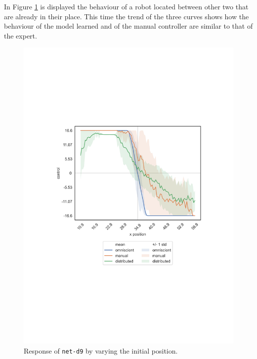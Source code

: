 In Figure \ref{fig:net-d9responseposition} is displayed the behaviour of a robot 
located between other two that are already in their place.
This time the trend of the three curves shows how the behaviour of the model 
learned and of the manual controller are similar to that of the expert.
\begin{figure}[!htb]
	\centering
	\includegraphics[width=.45\textwidth]{contents/images/net-d9/response-varying_init_position-distributed}%
	\caption{Response of \texttt{net-d9} by varying the initial position.}
	\label{fig:net-d9responseposition}
\end{figure}

